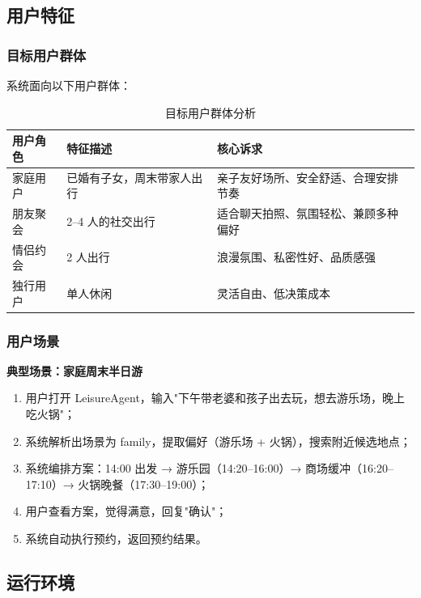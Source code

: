 \documentclass[12pt,a4paper]{ctexart}
\begin{document}
\subsection{用户特征}

\subsubsection{目标用户群体}

系统面向以下用户群体：

\begin{table}[ht]
\centering
\begin{tabular}{p{2.5cm}p{4cm}p{6cm}}
\toprule
\textbf{用户角色} & \textbf{特征描述} & \textbf{核心诉求} \\
\midrule
家庭用户 & 已婚有子女，周末带家人出行 & 亲子友好场所、安全舒适、合理安排节奏 \\
朋友聚会 & 2--4 人的社交出行 & 适合聊天拍照、氛围轻松、兼顾多种偏好 \\
情侣约会 & 2 人出行 & 浪漫氛围、私密性好、品质感强 \\
独行用户 & 单人休闲 & 灵活自由、低决策成本 \\
\bottomrule
\end{tabular}
\caption{目标用户群体分析}
\label{tab:users}
\end{table}

\subsubsection{用户场景}

\textbf{典型场景：家庭周末半日游}

\begin{enumerate}[label=\textbf{步骤 \arabic*:}]
  \item 用户打开 LeisureAgent，输入"下午带老婆和孩子出去玩，想去游乐场，晚上吃火锅"；
  \item 系统解析出场景为 family，提取偏好（游乐场 + 火锅），搜索附近候选地点；
  \item 系统编排方案：14:00 出发 → 游乐园（14:20--16:00）→ 商场缓冲（16:20--17:10）→ 火锅晚餐（17:30--19:00）；
  \item 用户查看方案，觉得满意，回复"确认"；
  \item 系统自动执行预约，返回预约结果。
\end{enumerate}

\subsection{运行环境}
\end{document}
